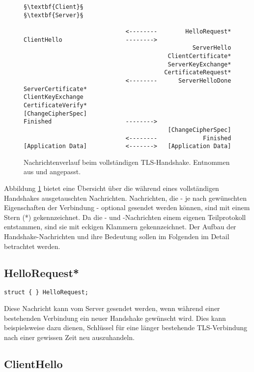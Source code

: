 \lstset{
	style=default,
	frame=single
}
\begin{figure}[H]
	\centering
	\begin{lstlisting}
§\textbf{Client}§                                               §\textbf{Server}§

                             <--------        HelloRequest*
ClientHello                  -------->
                                                ServerHello
                                         ClientCertificate*
                                         ServerKeyExchange*
                                        CertificateRequest*
                             <--------      ServerHelloDone
ServerCertificate*
ClientKeyExchange
CertificateVerify*
[ChangeCipherSpec]
Finished                     -------->
                                         [ChangeCipherSpec]
                             <--------             Finished
[Application Data]           <------->   [Application Data]
	\end{lstlisting}
	\caption{Nachrichtenverlauf beim vollständigen TLS-Handshake. Entnommen aus \cite{tls12} und angepasst.}
	\label{fig_complete_handshake}
\end{figure}
\lstset{style=tls}

Abbildung \ref{fig_complete_handshake} bietet eine Übersicht über die während eines vollständigen Handshakes ausgetauschten Nachrichten. Nachrichten, die - je nach gewünschten Eigenschaften der Verbindung - optional gesendet werden können, sind mit einem Stern (*) gekennzeichnet. Da die \changecipherspec{}- und \applicationdata{}-Nachrichten einem eigenen Teilprotokoll entstammen, sind sie mit eckigen Klammern gekennzeichnet. Der Aufbau der Handshake-Nachrichten und ihre Bedeutung sollen im Folgenden im Detail betrachtet werden.

\subsection{HelloRequest*}

\begin{lstlisting}
struct { } HelloRequest;
\end{lstlisting}

Diese Nachricht kann vom Server gesendet werden, wenn während einer bestehenden Verbindung ein neuer Handshake gewünscht wird. Dies kann beispielsweise dazu dienen, Schlüssel für eine länger bestehende TLS-Verbindung nach einer gewissen Zeit neu auszuhandeln.

\subsection{ClientHello}
\label{sec_handshake_client_hello}

